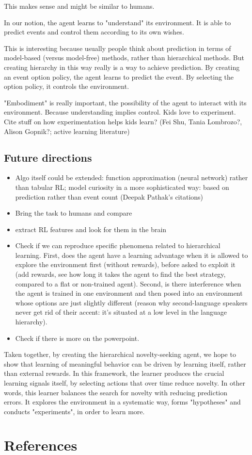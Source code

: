 \documentclass{article}
\begin{document}
This makes sense and might be similar to humans.

In our notion, the agent learns to "understand" its environment. It is able to predict events and control them according to its own wishes.

This is interesting because usually people think about prediction in terms of model-based (versus model-free) methods, rather than hierarchical methods. But creating hierarchy in this way really is a way to achieve prediction. By creating an event option policy, the agent learns to predict the event. By selecting the option policy, it controls the environment.

"Embodiment" is really important, the possibility of the agent to interact with its environment. Because understanding implies control. Kids love to experiment. Cite stuff on how experimentation helps kids learn? (Fei Shu, Tania Lombrozo?, Alison Gopnik?; active learning literature)

\subsection{Future directions}

\begin{itemize}
	\item Algo itself could be extended: function approximation (neural network) rather than tabular RL; model curiosity in a more sophisticated way: based on prediction rather than event count (Deepak Pathak's citations)
	\item Bring the task to humans and compare
	\item extract RL features and look for them in the brain
	\item Check if we can reproduce specific phenomena related to hierarchical learning. First, does the agent have a learning advantage when it is allowed to explore the environment first (without rewards), before asked to exploit it (add rewards, see how long it takes the agent to find the best strategy, compared to a flat or non-trained agent). Second, is there interference when the agent is trained in one environment and then posed into an environment whose options are just slightly different (reason why second-language speakers never get rid of their accent: it's situated at a low level in the language hierarchy).
	\item Check if there is more on the powerpoint.
\end{itemize}

Taken together, by creating the hierarchical novelty-seeking agent, we hope to show that learning of meaningful behavior can be driven by learning itself, rather than external rewards. In this framework, the learner produces the crucial learning signals itself, by selecting actions that over time reduce novelty. In other words, this learner balances the search for novelty with reducing prediction errors. It explores the environment in a systematic way, forms "hypotheses" and conducts "experiments", in order to learn more. 

\section*{References}

\printbibliography
\end{document}

